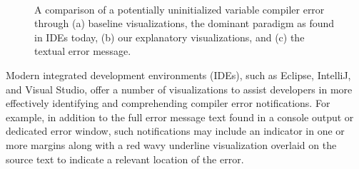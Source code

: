 \documentclass[conference]{IEEEtran}
\begin{document}
\begin{figure}[!t]
  \\
  \caption{A comparison of a potentially uninitialized variable compiler error through (a) baseline visualizations, the dominant paradigm as found in IDEs today, (b) our explanatory visualizations, and (c) the textual error message.\label{fig:melon}}
\end{figure}

Modern integrated development environments (IDEs), such as Eclipse, IntelliJ, and Visual Studio, offer a number of visualizations to assist developers in more effectively identifying and comprehending compiler error notifications. For example, in addition to the full error message text found in a console output or dedicated error window, such notifications may include an indicator in one or more margins along with a red wavy underline visualization overlaid on the source text to indicate a relevant location of the error.
\end{document}
